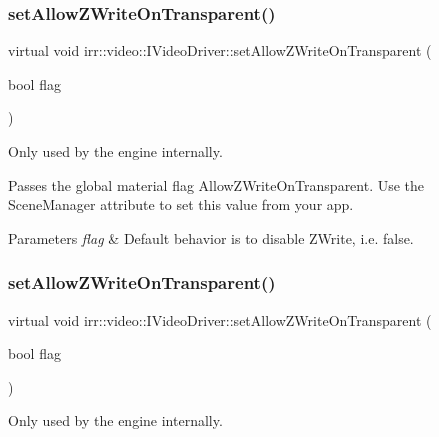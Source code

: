 \subsubsection{\texorpdfstring{set\+Allow\+Z\+Write\+On\+Transparent()}{setAllowZWriteOnTransparent()}\hspace{0.1cm}{\footnotesize\ttfamily [1/2]}}
{\footnotesize\ttfamily virtual void irr\+::video\+::\+I\+Video\+Driver\+::set\+Allow\+Z\+Write\+On\+Transparent (\begin{DoxyParamCaption}\item[{bool}]{flag }\end{DoxyParamCaption})\hspace{0.3cm}{\ttfamily [pure virtual]}}



Only used by the engine internally. 

Passes the global material flag Allow\+Z\+Write\+On\+Transparent. Use the Scene\+Manager attribute to set this value from your app. 
\begin{DoxyParams}{Parameters}
{\em flag} & Default behavior is to disable Z\+Write, i.\+e. false. \\
\hline
\end{DoxyParams}
\mbox{\label{classirr_1_1video_1_1IVideoDriver_af78022589e5b7cb42b4d6ed2f7950e42}} 
\subsubsection{\texorpdfstring{set\+Allow\+Z\+Write\+On\+Transparent()}{setAllowZWriteOnTransparent()}\hspace{0.1cm}{\footnotesize\ttfamily [2/2]}}
{\footnotesize\ttfamily virtual void irr\+::video\+::\+I\+Video\+Driver\+::set\+Allow\+Z\+Write\+On\+Transparent (\begin{DoxyParamCaption}\item[{bool}]{flag }\end{DoxyParamCaption})\hspace{0.3cm}{\ttfamily [pure virtual]}}



Only used by the engine internally. 

